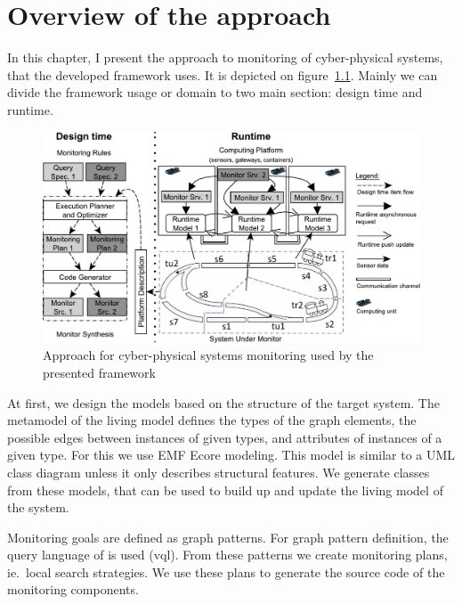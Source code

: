 
\chapter{Overview of the approach}


In this chapter, I present the approach to monitoring of cyber-physical systems, that the developed framework uses. It is depicted on figure~\ref{fig:approach}. Mainly we can divide the framework usage or domain to two main section: design time and runtime. 

\begin{figure}[h]
	\begin{center}
		\includegraphics[width=\textwidth]{figures/fase-overview-crop.pdf}
		\caption{Approach for cyber-physical systems monitoring used by the presented framework }
		\label{fig:approach}
	\end{center}
\end{figure}


At first, we design the models based on the structure of the target system. The metamodel of the living model defines the types of the graph elements, the possible edges between instances of given types, and attributes of instances of a given type. For this we use EMF Ecore modeling. This model is similar to a UML class diagram unless it only describes structural features. We generate \cpp{} classes from these models, that can be used to build up and update the living model of the system.

Monitoring goals are defined as graph patterns. For graph pattern definition, the query language of \viatra{} is used (vql). From these patterns we create monitoring plans, ie.\ local search strategies. We use these plans to generate the source code of the monitoring components.

